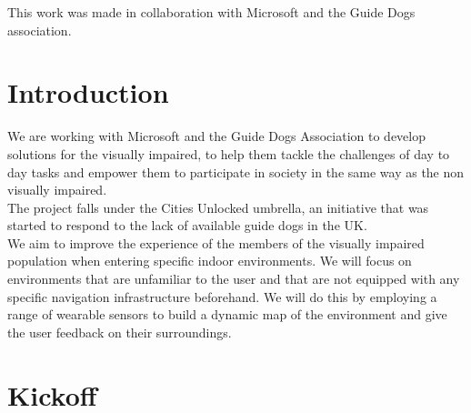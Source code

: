 \documentclass[prodmode,acmtecs]{acmsmall} %
\begin{document}


\begin{bottomstuff}
This work was made in collaboration with Microsoft and the Guide Dogs association.
\end{bottomstuff}

\maketitle

\section{Introduction}
We are working with Microsoft and the Guide Dogs Association to develop solutions for the visually impaired, to help them tackle the challenges of day to day tasks and empower them to participate in society in the same way as the non visually impaired.\\
The project falls under the Cities Unlocked 
umbrella, an initiative that was started to respond to the lack of available guide dogs in the UK.\\
We aim to improve the experience of the members of the visually impaired population when entering specific indoor environments.
We will focus on environments that are unfamiliar to the user and that are not equipped with any specific navigation infrastructure beforehand.
We will do this by employing a range of wearable  sensors to build a dynamic map of the environment and give the user feedback on their surroundings.

\section{Kickoff}
\end{document}
